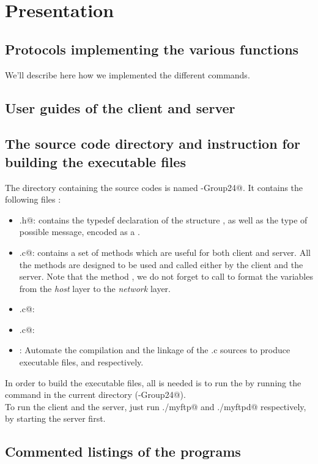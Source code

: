 \documentclass{article}
\begin{document}
\section{Presentation}
\subsection{Protocols implementing the various functions}
We'll describe here how we implemented the different commands.
\begin{itemize}

\end{itemize}
\subsection{User guides of the client and server}
\subsection{The source code directory and instruction for building the executable files}
The directory containing the source codes is named -Group24@.  It contains the following files : 
\begin{itemize}
\item \verb@header.h@: contains the typedef declaration of the structure \verb@msgHeader@, as well as the type of possible message, encoded as a \verb@int@.
\item \verb@utils.c@: contains a set of methods which are useful for both client and server. All the methods are designed to be used and called either by the client and the server. Note that the method \verb@sendType@, we do not forget to call \verb@htonl@ to format the \verb@int@ variables from the \textit{host} layer to the \textit{network} layer.
\item \verb@myftp.c@:
\item \verb@myftpd.c@:
\item \verb@Makefile@: Automate the compilation and the linkage of the .c sources to produce executable files, \verb@myftp@ and \verb@myftpd@ respectively.
\end{itemize}
In order to build the executable files, all is needed is to run the \verb@Makefile@ by running the \verb@make@ command in the current directory (-Group24@).\\

To run the client and the server, just run \verb@./myftp@ and \verb@./myftpd@ respectively, by starting the server first.
\subsection{Commented listings of the programs}
\end{document}

